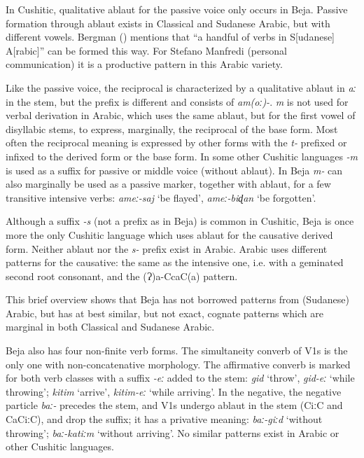 \documentclass[output=paper]{langsci/langscibook}
\begin{document}
In Cushitic, qualitative ablaut for the passive voice only occurs in Beja. Passive formation through ablaut exists in Classical and Sudanese Arabic, but with different vowels. Bergman (\citeyear[34]{Bergman2002}) mentions that “a handful of verbs in S[udanese] A[rabic]” can be formed this way. For Stefano Manfredi (personal communication) it is a productive pattern in this Arabic variety.

Like the passive voice, the reciprocal is characterized by a qualitative ablaut in \textit{aː} in the stem, but the prefix is different and consists of \textit{am(oː)-}. \textit{m} is not used for verbal derivation in Arabic, which uses the same ablaut, but for the first vowel of disyllabic stems, to express, marginally, the reciprocal of the base form. Most often the reciprocal meaning is expressed by other forms with the \textit{t-} prefixed or infixed to the derived form or the base form. In some other Cushitic languages \textit{\nobreakdash-m} is used as a suffix for passive or middle voice (without ablaut). In Beja \textit{m-} can also marginally be used as a passive marker, together with ablaut, for a few transitive intensive verbs: \textit{ameː\nobreakdash-saj} ‘be flayed’, \textit{ameː\nobreakdash-biɖan} ‘be forgotten’.

Although a suffix \textit{{}-s} (not a prefix as in Beja) is common in Cushitic, Beja is once more the only Cushitic language which uses ablaut for the causative derived form. Neither ablaut nor the \textit{s-} prefix exist in Arabic. Arabic uses different patterns for the causative: the same as the intensive one, i.e. with a geminated second root consonant, and the (Ɂ)a-CcaC(a) pattern.

This brief overview shows that Beja has not borrowed patterns from (Sudanese) Arabic, but has at best similar, but not exact, cognate patterns which are marginal in both Classical and Sudanese Arabic.

Beja also has four non-finite verb forms. The simultaneity converb of V1s is the only one with non-concatenative morphology. The affirmative converb is marked for both verb classes with a suffix \textit{{}-eː} added to the stem: \textit{gid} ‘throw’, \textit{gid\nobreakdash-eː} ‘while throwing’; \textit{kitim} ‘arrive’, \textit{kitim-eː} ‘while arriving’. In the negative, the negative particle \textit{baː-} precedes the stem, and V1s undergo ablaut in the stem (CiːC and CaCiːC), and drop the suffix; it has a privative meaning: \textit{baː-giːd} ‘without throwing’; \textit{baː-katiːm} ‘without arriving’. No similar patterns exist in Arabic or other Cushitic languages.
\end{document}
